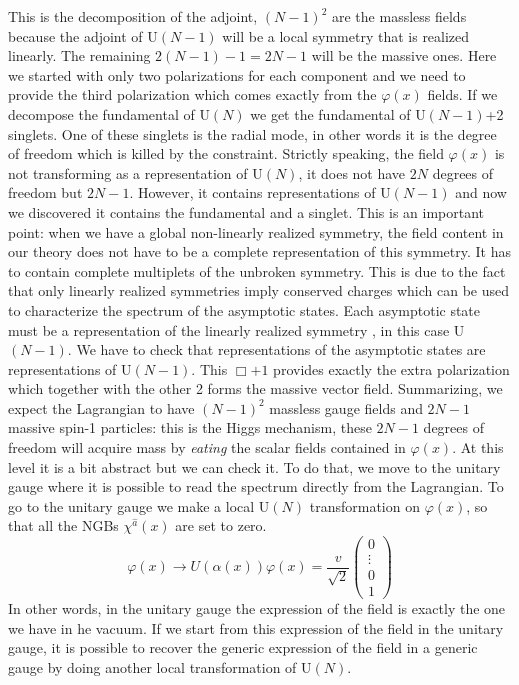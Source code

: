 \documentclass[../main.tex]{subfiles}
\begin{document}
This is the decomposition of the adjoint, $(N-1)^2$ are the massless fields because the adjoint of U$(N-1)$ will be a local symmetry that is realized linearly. The remaining $2(N-1)-1=2N-1$ will be the massive ones. Here we started with only two polarizations for each component and we need to provide the third polarization which comes exactly from the $\varphi(x)$ fields. If we decompose the fundamental of U$(N)$ we get the fundamental of U$(N-1)$+2 singlets. One of these singlets is the radial mode, in other words it is the degree of freedom which is killed by the constraint. Strictly speaking, the field $\varphi(x)$ is not transforming as a representation of U$(N)$, it does not have $2N$ degrees of freedom but $2N-1$. However, it contains representations of U$(N-1)$ and now we discovered it contains the fundamental and a singlet. This is an important point: when we have a global non-linearly realized symmetry, the field content in our theory does not have to be a complete representation of this symmetry. It has to contain complete multiplets of the unbroken symmetry. This is due to the fact that only linearly realized symmetries imply conserved charges which can be used to characterize the spectrum of the asymptotic states. Each asymptotic state must be a representation of the linearly realized symmetry , in this case U$(N-1)$. We have to check that representations of the asymptotic states are representations of U$(N-1)$. This $\Box+1$ provides exactly the extra polarization which together with the other 2 forms the massive vector field. Summarizing, we expect the Lagrangian to have $(N-1)^2$ massless gauge fields and $2N-1$ massive spin-1 particles: this is the Higgs mechanism, these $2N-1$ degrees of freedom will acquire mass by \textit{eating} the scalar fields  contained in $\varphi(x)$. At this level it is a bit abstract but we can check it. To do that, we move to the unitary gauge where it is possible to read the spectrum directly from the Lagrangian. To go to the unitary gauge we make a local U$(N)$ transformation on $\varphi(x)$, so that all the NGBs $\chi^{\hat{a}}(x)$ are set to zero.
\[
\varphi(x)\to U(\alpha(x))\varphi(x)=\frac{v}{\sqrt{2}}\begin{pmatrix}
    0\\
    \vdots\\
    0\\
    1
\end{pmatrix}
\]
In other words, in the unitary gauge the expression of the field is exactly the one we have in he vacuum. If we start from this expression of the field in the unitary gauge, it is possible to recover the generic expression of the field in a generic gauge by doing another local transformation of U$(N)$. 
\end{document}

